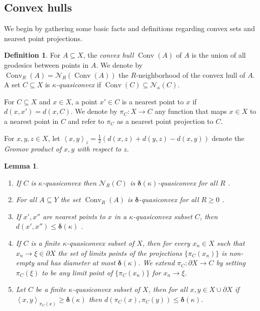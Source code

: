 \documentclass{amsart}
\numberwithin{equation}{section}
\newtheorem{lemma}[theorem]{Lemma}
\theoremstyle{definition}
\newtheorem{definition}[theorem]{Definition}
\newcommand{\calN}{\mathcal{N}}
\newcommand{\gen}[1]{\left< #1 \right>}
\newcommand{\bdelta}{{\boldsymbol\delta}}
\DeclareMathOperator{\conv}{Conv}
\begin{document}
\subsection{Convex hulls}

We begin by gathering some basic facts and definitions regarding convex sets and nearest point projections.

\begin{definition}
    For $A\subseteq X$, the \emph{convex hull} $\conv(A)$ of $A$ is the union of all geodesics between points in $A$. 
    We denote by $\conv_R(A) = \calN_R(\conv(A))$ the $R$-neighborhood of the convex hull of $A$.
    A set $C\subseteq X$ is \emph{$\kappa$-quasiconvex} if $\conv(C)\subseteq \calN_\kappa(C)$.

    For $C\subseteq X$ and $x\in X$, a point $x'\in C$ is a nearest point to $x$ if $d(x,x') = d(x,C)$.
    We denote by $\pi_C:X\to C$ any function that maps $x\in X$ to a nearest point in $C$ and refer to $\pi_C$ as a nearest point projection to $C$.

    For $x,y,z\in X$, let $\gen{x,y}_z = \tfrac 12(d(x,z)+d(y,z) - d(x,y))$ denote the \emph{Gromov product of $x,y$ with respect to $z$}.
\end{definition}


\begin{lemma}\label{facts about qc sets} $ $
\begin{enumerate}[label = (\arabic*)]
    \item If $C$ is $\kappa$-quasiconvex then $\calN_R(C)$ is $\bdelta(\kappa)$-quasiconvex for all $R$ \cite[Proposition 10.1.2]{coornaertdelzantpap}.
    \item \label{fact: convexity of convex hulls} For all $A\subseteq Y$ the set $\conv_R(A)$ is $\bdelta$-quasiconvex for all $R\ge 0$ \cite[Proposition 10.1.3]{coornaertdelzantpap}.
\item If $x',x''$ are nearest points to $x$ in a $\kappa$-quasiconvex subset $C$, then $d(x',x'')\le \bdelta(\kappa)$ \cite[Proposition 10.2.1]{coornaertdelzantpap}.
\item 
If $C$ is a finite $\kappa$-quasiconvex subset of $X$, then for every $x_n\in X$ such that $x_n\to \xi\in \partial X$ the set of limits points of the projections $\{\pi_C(x_n)\}$ is non-empty and has diameter at most $\bdelta(\kappa)$. 
We extend $\pi_C:\partial X\to C$ by setting $\pi_C(\xi)$ to be any limit point of $\{\pi_C(x_n)\}$ for $x_n\to \xi$.
\item \label{nearest point quadrilateral} Let $C$ be a finite $\kappa$-quasiconvex subset of $X$, then for all $x,y\in X\cup \partial X$ if $\gen{x,y}_{\pi_C(x)}\ge \bdelta(\kappa)$ then $d(\pi_C(x),\pi_C(y))\le \bdelta(\kappa)$. \hfill \qedsymbol
\end{enumerate}
\end{lemma}
\end{document}
